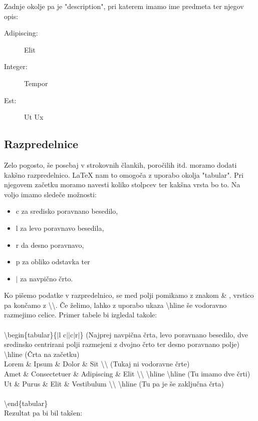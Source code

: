 \documentclass[a4paper]{book}
\newcommand\tbs{\textbackslash{}}
\begin{document}
Zadnje okolje pa je "description", pri katerem imamo ime predmeta ter njegov opis:
\begin{description}
\item[Adipiscing:] Elit
\item[Integer:] Tempor
\item[Est:] Ut Ux
\end{description}

\subsection{Razpredelnice}

Zelo pogosto, še posebaj v strokovnih člankih, poročilih itd. moramo dodati kakšno razpredelnico. \LaTeX{} nam to omogoča z uporabo okolja "tabular". 
Pri njegovem začetku moramo navesti koliko stolpcev ter kakšna vrsta bo to. Na voljo imamo sledeče možnosti:
\begin{itemize}
\item c za sredisko poravnano besedilo,
\item l za levo poravnavo besedila,
\item r da desno poravnavo,
\item p za obliko odstavka ter
\item $|$ za navpično črto.
\end{itemize}

Ko pišemo podatke v razpredelnico, se med polji pomikamo z znakom \& , vrstico pa končamo z \tbs\tbs. Če želimo, lahko z uporabo ukaza \tbs{}hline še vodoravno razmejimo celice.
Primer tabele bi izgledal takole:\\ \\
\tbs{}begin\{tabular\}\{$|$l c$||$c$|$r$|$\} (Najprej navpična črta, levo poravnano besedilo, dve sredinsko centrirani polji razmejeni z dvojno črto ter desno poravnano polje)\\
\tbs{}hline (Črta na začetku)\\
Lorem \& Ipsum \& Dolor \& Sit \tbs{}\tbs{} (Tukaj ni vodoravne črte)\\
Amet \& Consectetuer \& Adipiscing \& Elit \tbs{}\tbs{} \tbs{}hline \tbs{}hline (Tu imamo dve črti)\\
Ut \& Purus \& Elit \& Vestibulum \tbs{}\tbs{} \tbs{}hline (Tu pa je še zaključna črta)\\\\
\tbs{}end\{tabular\}\\


Rezultat pa bi bil takšen:\\
\end{document}
